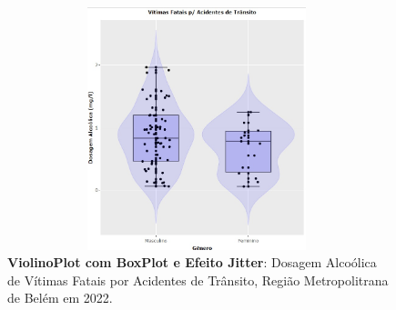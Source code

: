 \vspace{-2cm}
\begin{figure}[H]
    \centering
\includegraphics[scale=0.21,height=200pt,width=11cm]{figures/violinplot_jitter.jpeg}
    \caption{\textbf{ViolinoPlot com BoxPlot e Efeito Jitter}: Dosagem Alcoólica de Vítimas Fatais por Acidentes de Trânsito, Região Metropolitrana de Belém em 2022.}
    \label{fig:my_label25}
\end{figure}











